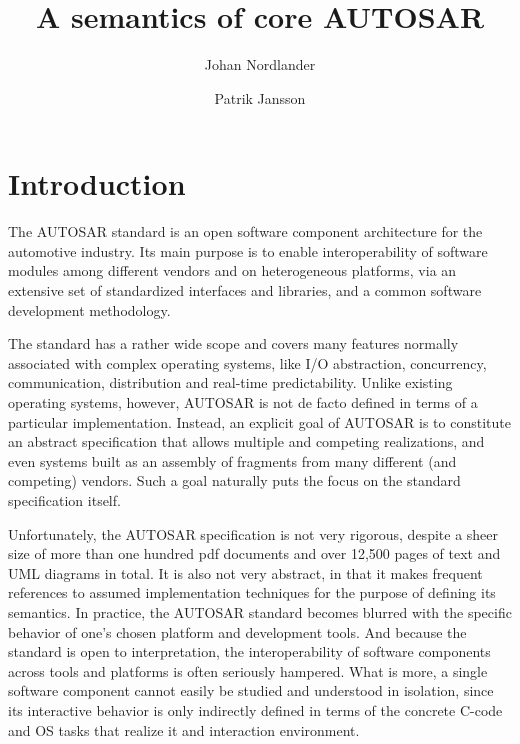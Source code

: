 \documentclass[twocolumn]{article}
\title{A semantics of core AUTOSAR}
\author{Johan Nordlander \and Patrik Jansson}
\begin{document}
\maketitle
\begin{abstract}

\end{abstract}

\section{Introduction}
\label{sec:Intro}

The AUTOSAR standard is an open software component architecture for the automotive industry. Its main purpose is to enable interoperability of software modules among different vendors and on heterogeneous platforms, via an extensive set of standardized interfaces and libraries, and a common software development methodology. 

The standard has a rather wide scope and covers many features normally associated with complex operating systems, like I/O abstraction, concurrency, communication, distribution and real-time predictability. Unlike existing operating systems, however, AUTOSAR is not de facto defined in terms of a particular implementation. Instead, an explicit goal of AUTOSAR is to constitute an abstract specification that allows multiple and competing realizations, and even systems built as an assembly of fragments from many different (and competing) vendors. Such a goal naturally puts the focus on the standard specification itself. 

Unfortunately, the AUTOSAR specification is not very rigorous, despite a sheer size of more than one hundred pdf documents and over 12,500 pages of text and UML diagrams in total. It is also not very abstract, in that it makes frequent references to assumed implementation techniques for the purpose of defining its semantics. In practice, the AUTOSAR standard becomes blurred with the specific behavior of one's chosen platform and development tools. And because the standard is open to interpretation, the interoperability of software components across tools and platforms is often seriously hampered. What is more, a single software component cannot easily be studied and understood in isolation, since its interactive behavior is only indirectly defined in terms of the concrete C-code and OS tasks that realize it and interaction environment.
\end{document}
